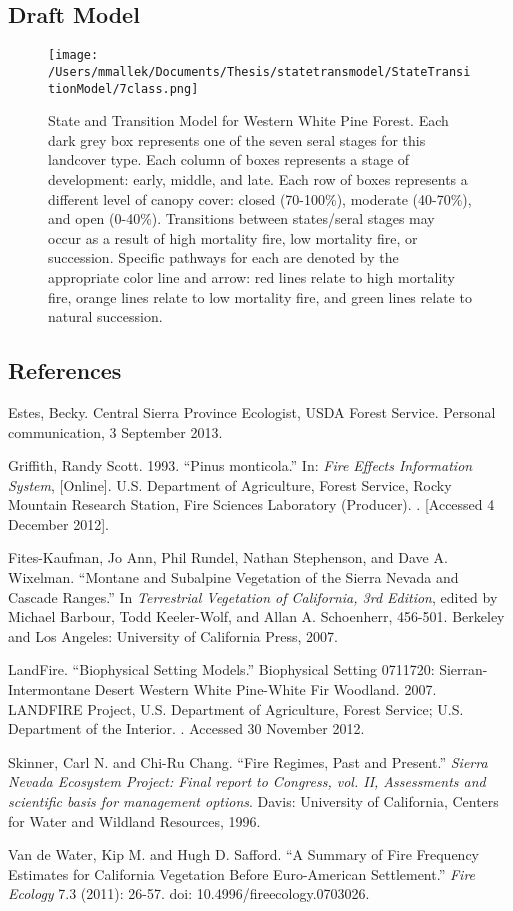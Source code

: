 \subsection*{Draft Model}
\begin{figure}[htbp]
\centering
\texttt{[image: /Users/mmallek/Documents/Thesis/statetransmodel/StateTransitionModel/7class.png]}
\caption{State and Transition Model for Western White Pine Forest. Each dark grey box represents one of the seven seral stages for this landcover type. Each column of boxes represents a stage of development: early, middle, and late. Each row of boxes represents a different level of canopy cover: closed (70-100\%), moderate (40-70\%), and open (0-40\%). Transitions between states/seral stages may occur as a result of high mortality fire, low mortality fire, or succession. Specific pathways for each are denoted by the appropriate color line and arrow: red lines relate to high mortality fire, orange lines relate to low mortality fire, and green lines relate to natural succession.} 
\label{transmodel}
\end{figure}

\subsection*{References}
\begin{hangparas}{.25in}{1} 
Estes, Becky. Central Sierra Province Ecologist, USDA Forest Service. Personal communication, 3 September 2013.

Griffith, Randy Scott. 1993. ``Pinus monticola.'' In: \emph{Fire Effects Information System}, [Online].  U.S. Department of Agriculture, Forest Service,  Rocky Mountain Research Station, Fire Sciences Laboratory (Producer).  . [Accessed 4 December 2012].

Fites-Kaufman, Jo Ann, Phil Rundel, Nathan Stephenson, and Dave A. Wixelman. ``Montane and Subalpine Vegetation of the Sierra Nevada and Cascade Ranges.'' In \emph{Terrestrial Vegetation of California, 3rd Edition}, edited by Michael Barbour, Todd Keeler-Wolf, and Allan A. Schoenherr, 456-501. Berkeley and Los Angeles: University of California Press, 2007. 

LandFire. ``Biophysical Setting Models.'' Biophysical Setting 0711720: Sierran-Intermontane Desert Western White Pine-White Fir Woodland. 2007. LANDFIRE Project, U.S. Department of Agriculture, Forest Service; U.S. Department of the Interior. . Accessed 30 November 2012.

Skinner, Carl N. and Chi-Ru Chang. ``Fire Regimes, Past and Present.'' \emph{Sierra Nevada Ecosystem Project: Final report to Congress, vol. II, Assessments and scientific basis for management options}. Davis: University of California, Centers for Water and Wildland Resources, 1996.

Van de Water, Kip M. and Hugh D. Safford. ``A Summary of Fire Frequency Estimates for California Vegetation Before Euro-American Settlement.'' \emph{Fire Ecology} 7.3 (2011): 26-57. doi: 10.4996/fireecology.0703026.

\end{hangparas}

